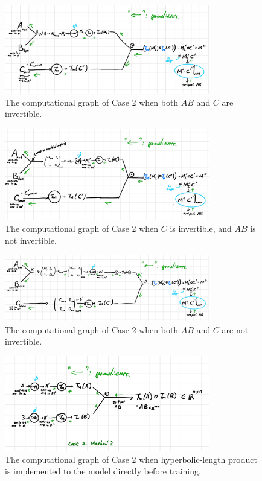 \documentclass{article}
\theoremstyle{plain}
\theoremstyle{plain} %
\theoremstyle{definition}  %
\theoremstyle{remark}  %
\theoremstyle{plain}
\begin{document}
\begin{figure}[H]
\caption{The computational graph of Case 2 when both $AB$ and $C$ are invertible.}
\centering
\includegraphics[width=0.8\textwidth]{2.png}
\end{figure}

\begin{figure}[H]
\caption{The computational graph of Case 2 when $C$ is invertible, and $AB$ is not invertible.}
\centering
\includegraphics[width=0.8\textwidth]{5.png}
\end{figure}

\begin{figure}[H]
\caption{The computational graph of Case 2 when both $AB$ and $C$ are not invertible.}
\centering
\includegraphics[width=0.8\textwidth]{4.png}
\end{figure}

\begin{figure}[H]
\caption{The computational graph of Case 2 when hyperbolic-length product is implemented to the model directly before training.}
\centering
\includegraphics[width=0.8\textwidth]{3.png}
\end{figure}
\end{document}
